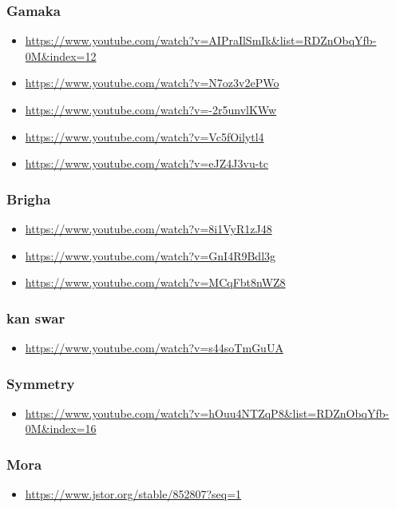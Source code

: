 \subsubsection{Gamaka}
\label{sec:org8fb9e24}
\begin{itemize}
\item \url{https://www.youtube.com/watch?v=AIPraIlSmIk\&list=RDZnObqYfb-0M\&index=12}
\item \url{https://www.youtube.com/watch?v=N7oz3v2ePWo}
\item \url{https://www.youtube.com/watch?v=-2r5unvlKWw}
\item \url{https://www.youtube.com/watch?v=Vc5fOilytl4}
\item \url{https://www.youtube.com/watch?v=eJZ4J3vu-tc}
\end{itemize}

\subsubsection{Brigha}
\label{sec:org042ce96}
\begin{itemize}
\item \url{https://www.youtube.com/watch?v=8i1VyR1zJ48}
\item \url{https://www.youtube.com/watch?v=GnI4R9Bdl3g}
\item \url{https://www.youtube.com/watch?v=MCqFbt8nWZ8}
\end{itemize}

\subsubsection{kan swar}
\label{sec:org7259947}
\begin{itemize}
\item \url{https://www.youtube.com/watch?v=s44soTmGuUA}
\end{itemize}

\subsubsection{Symmetry}
\label{sec:org9f34d3f}
\begin{itemize}
\item \url{https://www.youtube.com/watch?v=hOuu4NTZqP8\&list=RDZnObqYfb-0M\&index=16}
\end{itemize}

\subsubsection{Mora}
\label{sec:org8775823}
\begin{itemize}
\item \url{https://www.jstor.org/stable/852807?seq=1}
\end{itemize}

